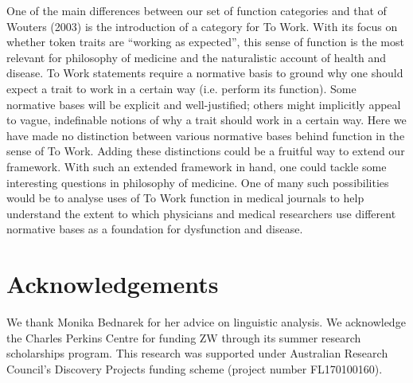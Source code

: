 \documentclass{article}
\begin{document}
One of the main differences between our set of function categories and that of Wouters (2003) is the introduction of a category for To Work.
With its focus on whether token traits are ``working as expected'', this sense of function is the most relevant for philosophy of medicine and the naturalistic account of health and disease.
To Work statements require a normative basis to ground why one should expect a trait to work in a certain way (i.e. perform its function).
Some normative bases will be explicit and well-justified; others might implicitly appeal to vague, indefinable notions of why a trait should work in a certain way.
Here we have made no distinction between various normative bases behind function in the sense of To Work.
Adding these distinctions could be a fruitful way to extend our framework.
With such an extended framework in hand, one could tackle some interesting questions in philosophy of medicine.
One of many such possibilities would be to analyse uses of To Work function in medical journals to help understand the extent to which physicians and medical researchers use different normative bases as a foundation for dysfunction and disease.

\section{Acknowledgements}
\label{sec:acknowledgements}

We thank Monika Bednarek for her advice on linguistic analysis.
We acknowledge the Charles Perkins Centre for funding ZW through its summer research scholarships program.
This research was supported under Australian Research Council's Discovery Projects funding scheme (project number FL170100160).



\end{document}
